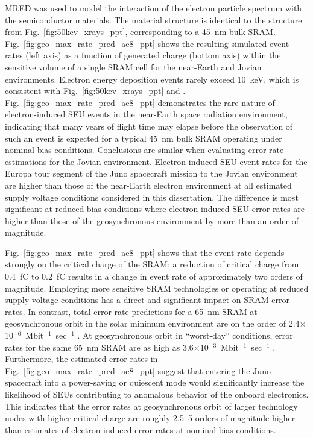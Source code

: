 MRED was used to model the interaction of the electron particle spectrum with the semiconductor materials. 
The material structure is identical to the structure from Fig.~\ref{fig:50kev_xrays_ppt}, corresponding to a 45~nm bulk SRAM.
Fig.~\ref{fig:geo_max_rate_pred_ae8_ppt} shows the resulting simulated event rates (left axis) as a function of generated charge (bottom axis) within the sensitive volume of a single SRAM cell for the near-Earth and Jovian environments. 
Electron energy deposition events rarely exceed 10~keV, which is consistent with Fig.~\ref{fig:50kev_xrays_ppt} and \cite{King:2010cu, King:2012cb}. 
Fig.~\ref{fig:geo_max_rate_pred_ae8_ppt} demonstrates the rare nature of electron-induced SEU events in the near-Earth space radiation environment, indicating that many years of flight time may elapse before the observation of such an event is expected for a typical 45~nm bulk SRAM operating under nominal bias conditions.  
Conclusions are similar when evaluating error rate estimations for the Jovian environment.
Electron-induced SEU event rates for the Europa tour segment of the Juno spacecraft mission to the Jovian environment are higher than those of the near-Earth electron environment at all estimated supply voltage conditions considered in this dissertation.
The difference is most significant at reduced bias conditions where electron-induced SEU error rates are higher than those of the geosynchronous environment by more than an order of magnitude.

Fig.~\ref{fig:geo_max_rate_pred_ae8_ppt} shows that the event rate depends strongly on the critical charge of the SRAM; a reduction of critical charge from 0.4~fC to 0.2~fC results in a change in event rate of approximately two orders of magnitude. 
Employing more sensitive SRAM technologies or operating at reduced supply voltage conditions has a direct and significant impact on SRAM error rates. 
In contrast, total error rate predictions for a 65~nm SRAM at geosynchronous orbit in the solar minimum environment are on the order of 2.4$\times$10$^{-6}$~Mbit$^{-1}$~sec$^{-1}$ \cite{Sierawski:2009ka}.
At geosynchronous orbit in ``worst-day'' conditions, error rates for the same 65~nm SRAM are as high as 3.6$\times$10$^{-3}$~Mbit$^{-1}$~sec$^{-1}$ \cite{Sierawski:2009ka}.
Furthermore, the estimated error rates in Fig.~\ref{fig:geo_max_rate_pred_ae8_ppt} suggest that entering the Juno spacecraft into a power-saving or quiescent mode would significantly increase the likelihood of SEUs contributing to anomalous behavior of the onboard electronics.
This indicates that the error rates at geosynchronous orbit of larger technology nodes with higher critical charge are roughly 2.5--5 orders of magnitude higher than estimates of electron-induced error rates at nominal bias conditions.%

